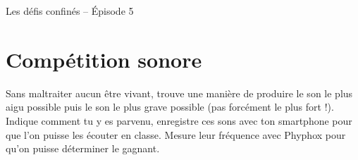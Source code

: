 \documentclass[12pt,a4paper]{article}
\begin{document}
\begin{header}
Les défis confinés -- Épisode 5
\end{header}

\section*{Compétition sonore}

Sans maltraiter aucun être vivant, trouve une manière de produire le son le plus aigu possible puis le son le plus grave possible (pas forcément le plus fort !).
Indique comment tu y es parvenu, enregistre ces sons avec ton smartphone pour que l'on puisse les écouter en classe.
Mesure leur fréquence avec Phyphox pour qu'on puisse déterminer le gagnant.
\end{document}
